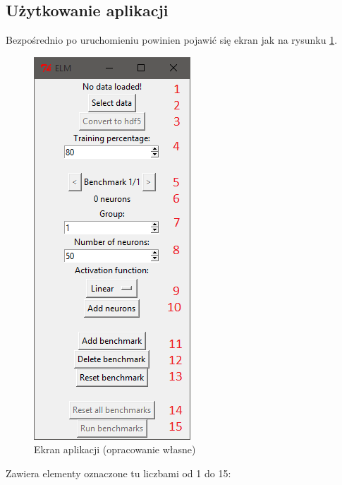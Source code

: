 \documentclass[pl]{minipw} %
\begin{document}
\subsection*{Użytkowanie aplikacji}
Bezpośrednio po uruchomieniu powinien pojawić się ekran jak na rysunku \ref{python_ekran}.
\begin{figure}[H]
\centering
\includegraphics{instrukcja_python_start.png}
\caption[Ekran aplikacji]{Ekran aplikacji (opracowanie własne)}
\label{python_ekran}
\end{figure}
Zawiera elementy oznaczone tu liczbami od 1 do 15:
\end{document}
